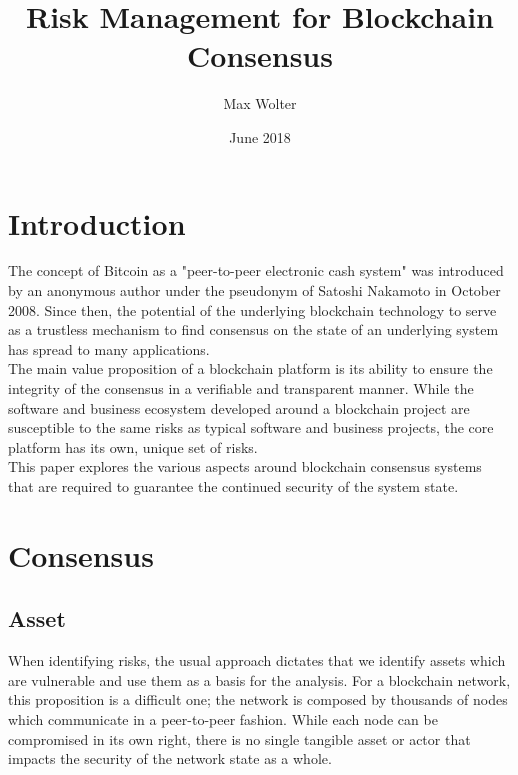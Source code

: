 \documentclass[11pt,a4paper,draft]{article}
\title{Risk Management for Blockchain Consensus}
\author{Max Wolter}
\date{June 2018}
\begin{document}
\maketitle
\begin{abstract}

\end{abstract}
\newpage

\tableofcontents
\newpage

\section{Introduction}

The concept of Bitcoin as a "peer-to-peer electronic cash system" was introduced by an anonymous author under the pseudonym of Satoshi Nakamoto in October 2008. Since then, the potential of the underlying blockchain technology to serve as a trustless mechanism to find consensus on the state of an underlying system has spread to many applications.\\

The main value proposition of a blockchain platform is its ability to ensure the integrity of the consensus in a verifiable and transparent manner. While the software and business ecosystem developed around a blockchain project are susceptible to the same risks as typical software and business projects, the core platform has its own, unique set of risks.\\

This paper explores the various aspects around blockchain consensus systems that are required to guarantee the continued security of the system state.\\

\section{Consensus}

\subsection{Asset}

When identifying risks, the usual approach dictates that we identify assets which are vulnerable and use them as a basis for the analysis. For a blockchain network, this proposition is a difficult one; the network is composed by thousands of nodes which communicate in a peer-to-peer fashion. While each node can be compromised in its own right, there is no single tangible asset or actor that impacts the security of the network state as a whole.\\
\end{document}

